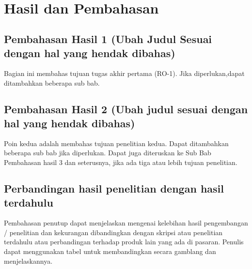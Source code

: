 \chapter{Hasil dan Pembahasan}

\section{Pembahasan Hasil 1 (Ubah Judul Sesuai dengan hal yang hendak dibahas)}

Bagian ini membahas tujuan tugas akhir pertama (RO-1). Jika diperlukan,dapat 
ditambahkan beberapa sub bab.

\section{Pembahasan Hasil 2 (Ubah judul sesuai dengan hal yang hendak dibahas)}

Poin kedua adalah membahas tujuan penelitian kedua. Dapat ditambahkan beberapa 
sub bab jika diperlukan. Dapat juga diteruskan ke Sub Bab Pembahasan hasil 3 dan 
seterusnya, jika ada tiga atau lebih tujuan penelitian.

\section{Perbandingan hasil penelitian dengan hasil terdahulu}

Pembahasan penutup dapat menjelaskan mengenai kelebihan hasil pengembangan / 
penelitian dan kekurangan dibandingkan dengan skripsi atau penelitian terdahulu atau
perbandingan terhadap produk lain yang ada di pasaran. Penulis dapat menggunakan tabel untuk membandingkan secara gamblang dan menjelaskannya.